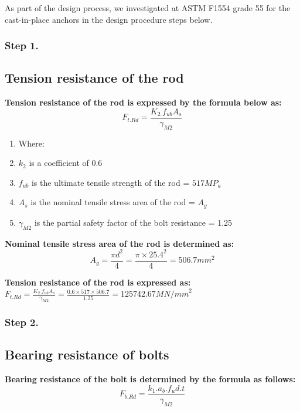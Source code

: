 {As part of the design process, we investigated at ASTM F1554 grade 55 for the cast-in-place anchors in the design procedure steps below.



\subsubsection{\textbf{Step 1.}}

\subsection{Tension resistance of the rod}

\textbf{Tension resistance of the rod is expressed by the formula below as:}
\begin{equation}
F_{t.Rd}=\frac{K_{2.}f_{ub}A_s}{\gamma_{M2}}
\end{equation}

\begin{enumerate}[label={}]
\item Where: 
\item \(k_2\) is a coefficient of 0.6
\item \(f_{ub}\) is the ultimate tensile strength of the rod = \(517{MP}_a\)     
\item \(A_s\) is the nominal tensile stress area of the rod = \(A_g\)
\item \(\gamma_{M2}\) is the partial safety factor of the bolt resistance = 1.25
\end{enumerate}

\textbf{Nominal tensile stress area of the rod is determined as:}
\begin{equation}
A_g = \frac{\pi d^2}{4} = \frac{\pi\times{25.4}^2}{4} = 506.7mm^2 
\end{equation}

\textbf{Tension resistance of the rod is expressed as:}
\(F_{t.Rd}=\frac{K_{2.}f_{ub}A_s}{\gamma_{M2}} = \frac{0.6\times517\times506.7}{1.25} = 125742.67M{N/mm}^2\)     

\subsubsection{\textbf{Step 2.}}


\subsection{Bearing resistance of bolts}

\textbf{Bearing resistance of the bolt is determined by the formula as follows: }
\begin{equation}
F_{b.Rd} = \frac{k_1.a_b.f_ud.t}{\gamma_{M2}}     
\end{equation}

}
